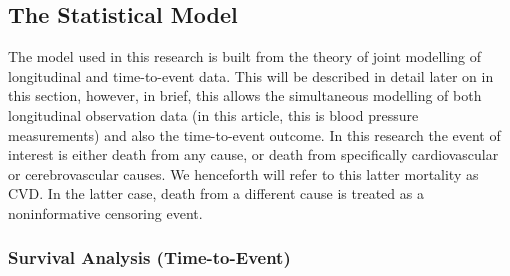 \documentclass[
]{article}
\begin{document}
\subsection{The Statistical Model}\label{the-statistical-model}

The model used in this research is built from the theory of joint modelling of longitudinal and time-to-event data. This will be described in detail later on in this section, however, in brief, this allows the simultaneous modelling of both longitudinal observation data (in this article, this is blood pressure measurements) and also the time-to-event outcome.
In this research the event of interest is either death from any cause, or death from specifically cardiovascular or cerebrovascular causes. We henceforth will refer to this latter mortality as CVD.
In the latter case, death from a different cause is treated as a noninformative censoring event.

\subsubsection{Survival Analysis (Time-to-Event)}\label{survival-analysis-time-to-event}
\end{document}

